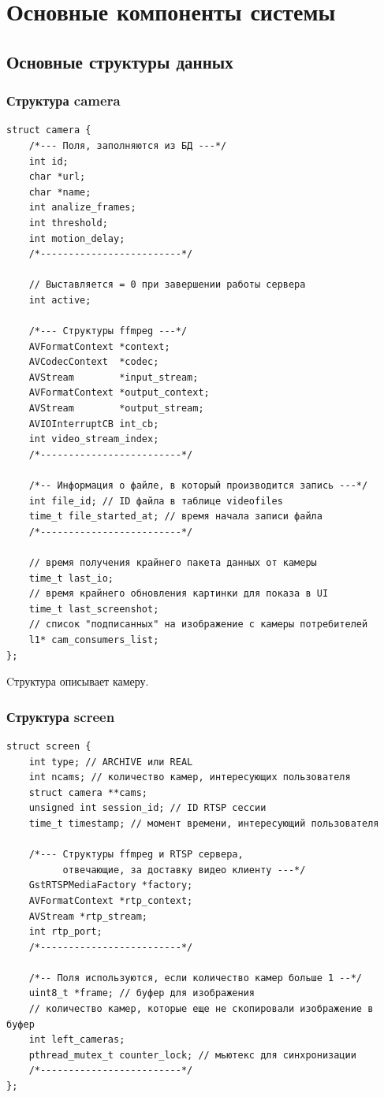 \chapter{Основные компоненты системы}

\section{Основные структуры данных}

\subsection{Структура camera}
\begin{verbatim}
struct camera {
    /*--- Поля, заполняются из БД ---*/
    int id;
    char *url;
    char *name;
    int analize_frames;
    int threshold;
    int motion_delay;
    /*-------------------------*/
    
    // Выставляется = 0 при завершении работы сервера
    int active;
    
    /*--- Структуры ffmpeg ---*/
    AVFormatContext *context;
    AVCodecContext  *codec;
    AVStream        *input_stream;
    AVFormatContext *output_context;
    AVStream        *output_stream;
    AVIOInterruptCB int_cb;
    int video_stream_index;
    /*-------------------------*/

    /*-- Информация о файле, в который производится запись ---*/
    int file_id; // ID файла в таблице videofiles
    time_t file_started_at; // время начала записи файла
    /*-------------------------*/
    
    // время получения крайнего пакета данных от камеры
    time_t last_io;
    // время крайнего обновления картинки для показа в UI
    time_t last_screenshot;
	// список "подписанных" на изображение с камеры потребителей
    l1* cam_consumers_list;
};
\end{verbatim}

Cтруктура описывает камеру.

\subsection{Структура screen}
\begin{verbatim}
struct screen {
    int type; // ARCHIVE или REAL
    int ncams; // количество камер, интересующих пользователя
    struct camera **cams;
    unsigned int session_id; // ID RTSP сессии
    time_t timestamp; // момент времени, интересующий пользователя
    
    /*--- Структуры ffmpeg и RTSP сервера,
          отвечающие, за доставку видео клиенту ---*/
    GstRTSPMediaFactory *factory;
    AVFormatContext *rtp_context;
    AVStream *rtp_stream;
    int rtp_port;
    /*-------------------------*/
    
    /*-- Поля используются, если количество камер больше 1 --*/
    uint8_t *frame; // буфер для изображения
    // количество камер, которые еще не скопировали изображение в буфер
    int left_cameras;
    pthread_mutex_t counter_lock; // мьютекс для синхронизации
    /*-------------------------*/
};
\end{verbatim}

